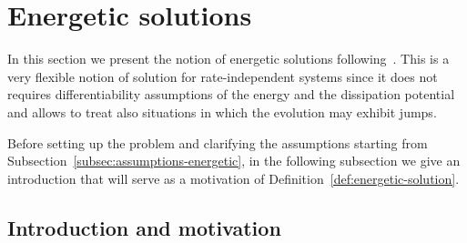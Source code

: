 \documentclass[a4paper,10pt,oneside]{amsbook}
\numberwithin{section}{chapter}
\numberwithin{equation}{chapter}
\theoremstyle{definition}
\begin{document}
\section{Energetic solutions}
\label{sec:energetic-solution}

In this section we present the notion of energetic solutions following~\cite{francfort,rate-independent-systems}. This is a very flexible notion of solution for rate-independent systems since it does not requires differentiability assumptions of the energy and the dissipation potential and allows to treat also situations in which the evolution may exhibit jumps.

Before setting up the problem and clarifying the assumptions starting from Subsection~\ref{subsec:assumptions-energetic}, in the following subsection we give an introduction that will serve as a motivation of Definition~\ref{def:energetic-solution}.

\subsection{Introduction and motivation}
\end{document}
